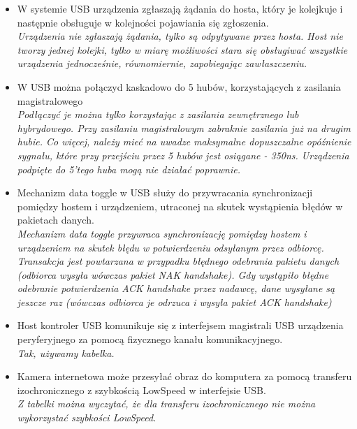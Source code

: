\begin{itemize}
	\item \textcolor{nie}{W systemie USB urządzenia zgłaszają żądania do hosta, który je kolejkuje i następnie obsługuje w kolejności pojawiania się zgłoszenia.} \\
	{\small \emph{Urządzenia nie zgłaszają żądania, tylko są odpytywane przez hosta. Host nie tworzy jednej kolejki, tylko w miarę możliwości stara się obsługiwać wszystkie urządzenia jednocześnie, równomiernie, zapobiegając zawłaszczeniu.}}
	
	\item \textcolor{nie}{W USB można połączyd kaskadowo do 5 hubów, korzystających z zasilania magistralowego} \\
	{\small \emph{Podłączyć je można tylko korzystając z zasilania zewnętrznego lub hybrydowego. Przy zasilaniu magistralowym zabraknie zasilania już na drugim hubie. Co więcej, należy mieć na uwadze maksymalne dopuszczalne opóźnienie sygnału, które przy przejściu przez 5 hubów jest osiągane - 350ns. Urządzenia podpięte do 5'tego huba mogą nie działać poprawnie.}}
	
	\item \textcolor{nie}{Mechanizm data toggle w USB służy do przywracania synchronizacji pomiędzy hostem i urządzeniem, utraconej na skutek wystąpienia błędów w pakietach danych.} \\
	{\small \emph{Mechanizm data toggle przywraca synchronizację pomiędzy hostem i urządzeniem na skutek błędu w potwierdzeniu odsyłanym przez odbiorcę.\\
	Transakcja jest powtarzana w przypadku błędnego odebrania pakietu danych (odbiorca wysyła wówczas pakiet NAK handshake). Gdy wystąpiło błędne odebranie potwierdzenia ACK handshake przez nadawcę, dane wysyłane są jeszcze raz (wówczas odbiorca je odrzuca i wysyła pakiet ACK handshake) }}
	
	\item \textcolor{tak}{Host kontroler USB komunikuje się z interfejsem magistrali USB urządzenia peryferyjnego za pomocą fizycznego kanału komunikacyjnego.} \\
	{\small \emph{Tak, używamy kabelka.}}
	
	\item \textcolor{nie}{Kamera internetowa może przesyłać obraz do komputera za pomocą transferu izochronicznego z szybkością LowSpeed w interfejsie USB.} \\
	{\small \emph{Z tabelki można wyczytać, że dla transferu izochronicznego nie można wykorzystać szybkości LowSpeed.}}
	

\end{itemize}
